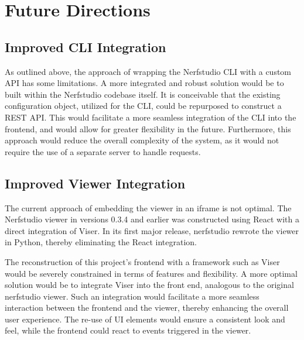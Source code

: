 \section{Future Directions}
\label{sec:system:future}

\subsection*{Improved CLI Integration}

As outlined above, the approach of wrapping the Nerfstudio CLI with a custom API has some limitations.
A more integrated and robust solution would be to built within the Nerfstudio codebase itself.
It is conceivable that the existing configuration object, utilized for the CLI, could be repurposed to construct a REST API.
This would facilitate a more seamless integration of the CLI into the frontend, and would allow for greater flexibility in the future.
Furthermore, this approach would reduce the overall complexity of the system, as it would not require the use of a separate server to handle requests.

\subsection*{Improved Viewer Integration}

The current approach of embedding the viewer in an iframe is not optimal.
The Nerfstudio viewer in versions 0.3.4 and earlier was constructed using React with a direct integration of Viser.
In its first major release, nerfstudio rewrote the viewer in Python, thereby eliminating the React integration.

The reconstruction of this project's frontend with a framework such as Viser would be severely constrained in terms of features and flexibility.
A more optimal solution would be to integrate Viser into the front end, analogous to the original nerfstudio viewer.
Such an integration would facilitate a more seamless interaction between the frontend and the viewer, thereby enhancing the overall user experience.
The re-use of UI elements would ensure a consistent look and feel, while the frontend could react to events triggered in the viewer.